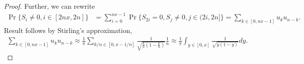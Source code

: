 \documentclass[a4paper,10pt,english]{article}
\begin{document}
\begin{proof} 
Further, we can rewrite
\begin{align*}
\Pr\{S_i \neq 0, i \in [2nx, 2n]\} &= \sum_{i=0}^{nx-1}\Pr\{S_{2i} = 0, S_j \neq 0, j \in (2i,2n]\} = \sum_{k \in [0,nx-1]}u_ku_{n-k}.
\end{align*}
Result follows by Stirling's approximation, 
\begin{align*}
\sum_{k \in [0,nx-1]}u_ku_{n-k} \approx \frac{1}{\pi} \sum_{k/n \in [0,x-1/n]} \frac{1}{\sqrt{\frac{k}{n}(1-\frac{k}{n})}}\frac{1}{n} \approx \frac{1}{\pi} \int_{y \in [0,x]} \frac{1}{\sqrt{y(1-y)}}dy.
\end{align*}
\end{proof}
\end{document}
